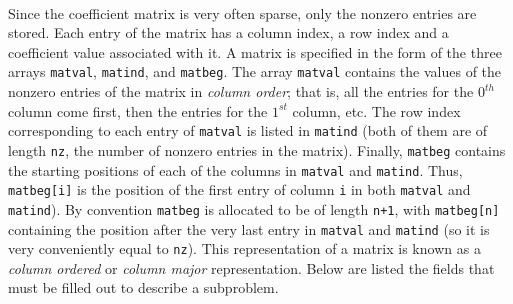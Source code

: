\begin{description}
\\
Since the coefficient matrix is very often sparse, only the nonzero entries
are stored. Each entry of the matrix has a column index, a row index and a
coefficient value associated with it. A matrix is specified in the form of the
three arrays \texttt{matval}, \texttt{matind}, and \texttt{matbeg}. The array
\texttt{matval} contains the values of the nonzero entries of the matrix in
\emph{column order}; that is, all the entries for the $0^{th}$ column come 
first, then the entries for the $1^{st}$ column, etc. The row index
corresponding to each entry of \texttt{matval} is listed in \texttt{matind}
(both of them are of length \texttt{nz}, the number of nonzero entries in the
matrix). Finally,
\texttt{matbeg} contains the starting positions of each of the columns in 
\texttt{matval} and \texttt{matind}. Thus, \texttt{matbeg[i]} is the position
of the first entry of column \texttt{i} in both \texttt{matval} and
\texttt{matind}). By convention \texttt{matbeg} is allocated to be of length
\texttt{n+1}, with \texttt{matbeg[n]} containing the position after the very
last entry in \texttt{matval} and \texttt{matind} (so it is very conveniently
equal to \texttt{nz}). This representation of a matrix is known as a {\em
column ordered} or {\em column major} representation. Below are listed the
fields that must be filled out to describe a subproblem.\\
\\


\end{description}
